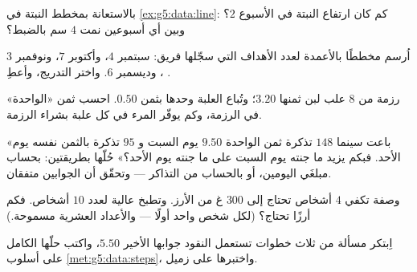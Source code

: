 \begin{exercise}[$\star$]\label{exo:g5:data:6}
بالاستعانة بمخطط النبتة في \cref{ex:g5:data:line}: كم كان ارتفاع
النبتة في الأسبوع $2$؟ وبين أي أسبوعين نمت
$4$ سم بالضبط؟
\end{exercise}

\begin{exercise}[$\star$]\label{exo:g5:data:7}
اُرسم مخططًا بالأعمدة لعدد الأهداف التي سجّلها فريق:
سبتمبر $4$، وأكتوبر $7$، ونوفمبر $3$، وديسمبر $6$. واختر
التدريج، وأعطِ .
\end{exercise}

\begin{exercise}[$\star$]\label{exo:g5:data:8}
رزمة من $8$ علب لبن ثمنها $3.20$؛ وتُباع العلبة وحدها بثمن $0.50$.
احسب ثمن «الواحدة» في الرزمة، وكم يوفّر المرء في كل علبة
بشراء الرزمة.
\end{exercise}

\begin{exercise}[$\star\star$]\label{exo:g5:data:9}
«باعت سينما $148$ تذكرة ثمن الواحدة $9.50$ يوم السبت و $95$ تذكرة
بالثمن نفسه يوم الأحد. فبكم يزيد ما جنته يوم السبت على ما جنته
يوم الأحد؟» حُلّها بطريقتين: بحساب مبلغَي اليومين، أو
بالحساب من \emph{} التذاكر --- وتحقّق أن
الجوابين متفقان.
\end{exercise}

\begin{exercise}[$\star\star$]\label{exo:g5:data:10}
وصفة تكفي $4$ أشخاص تحتاج إلى $300$ غ من الأرز. وتطبخ عالية
لعدد $10$ أشخاص. فكم أرزًا تحتاج؟ (لكل شخص واحد أولًا ---
والأعداد العشرية مسموحة.)
\end{exercise}

\begin{exercise}[$\star\star$]\label{exo:g5:data:11}
اِبتكر مسألة من ثلاث خطوات تستعمل النقود جوابها الأخير
$5.50$، واكتب حلّها الكامل على أسلوب
\cref{met:g5:data:steps}، واختبرها على زميل.
\end{exercise}
